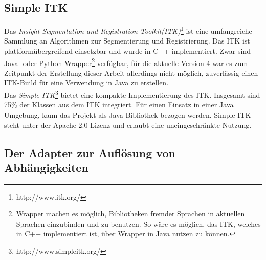 \FloatBarrier
\subsection{Simple ITK}
Das \textit{Insight Segmentation and Registration Toolkit(ITK)}\footnote{http://www.itk.org/} ist eine umfangreiche Sammlung an Algorithmen zur Segmentierung und Registrierung. Das ITK ist plattformübergreifend einsetzbar und wurde in C++ implementiert. Zwar sind Java- oder Python-Wrapper\footnote{Wrapper machen es möglich, Bibliotheken fremder Sprachen in aktuellen Sprachen einzubinden und zu benutzen. So wäre es möglich, das ITK, welches in C++ implementiert ist, über Wrapper in Java nutzen zu können.} verfügbar, für die aktuelle Version 4 war es zum Zeitpunkt der Erstellung dieser Arbeit allerdings nicht möglich, zuverlässig einen ITK-Build für eine Verwendung in Java zu erstellen.\\
Das \textit{Simple ITK}\footnote{http://www.simpleitk.org/} bietet eine kompakte Implementierung des ITK. Insgesamt sind 75\% der Klassen aus dem ITK integriert\cite{sitk:filter}. Für einen Einsatz in einer Java Umgebung, kann das Projekt als Java-Bibliothek bezogen werden. Simple ITK steht unter der Apache 2.0 Lizenz und erlaubt eine uneingeschränkte Nutzung.

\FloatBarrier
\subsection{Der Adapter zur Auflösung von Abhängigkeiten} \label{adapter_dependencies}

